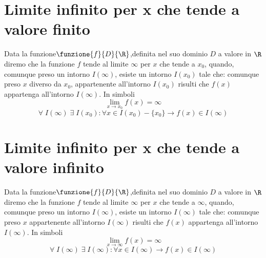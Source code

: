 \section{Limite infinito per x che tende a valore finito}
Data la funzione$\funzione{f}{D}{\R}$,definita nel suo dominio $D$ a valore in $\R$  diremo che la funzione $f$ tende al limite $\infty$ per $x$ che tende a $x_0$, quando, comunque preso un intorno $I(\infty)$, esiste un intorno $I(x_0)$ tale che: comunque preso $x$ diverso da $x_0$, appartenente  all'intorno $I(x_0)$ risulti che $f(x)$ appartenga all'intorno $I(\infty)$. In simboli
\begin{equation}
\lim_{x\to x_0}f(x)=\infty
\end{equation}
\begin{equation}
\forall\; I(\infty)\; \exists\; I(x_0) : \forall x\in I(x_0)-\lbrace x_0\rbrace \longrightarrow f(x)\in I(\infty)
\end{equation}
\section{Limite infinito per x che tende a valore infinito}
Data la funzione$\funzione{f}{D}{\R}$,definita nel suo dominio $D$ a valore in $\R$  diremo che la funzione $f$ tende al limite $\infty$ per $x$ che tende a $\infty$, quando, comunque preso un intorno $I(\infty)$, esiste un intorno $I(\infty)$ tale che: comunque preso $x$ appartenente  all'intorno $I(\infty)$ risulti che $f(x)$ appartenga all'intorno $I(\infty)$. In simboli
\begin{equation}
\lim_{x\to \infty}f(x)=\infty
\end{equation}
\begin{equation}
\forall\; I(\infty)\; \exists\; I(\infty) : \forall x\in I(\infty) \longrightarrow f(x)\in I(\infty)
\end{equation}
